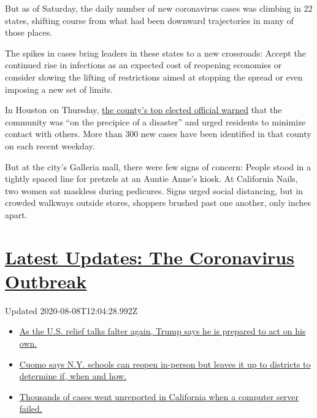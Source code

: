 But as of Saturday, the daily number of new coronavirus cases was
climbing in 22 states, shifting course from what had been downward
trajectories in many of those places.

The spikes in cases bring leaders in these states to a new crossroads:
Accept the continued rise in infections as an expected cost of reopening
economies or consider slowing the lifting of restrictions aimed at
stopping the spread or even imposing a new set of limits.

In Houston on Thursday,
\href{https://www.houstonchronicle.com/news/houston-texas/houston/article/Hidalgo-to-announce-COVID-19-threat-level-15332940.php}{the
county's top elected official warned} that the community was ``on the
precipice of a disaster'' and urged residents to minimize contact with
others. More than 300 new cases have been identified in that county on
each recent weekday.

But at the city's Galleria mall, there were few signs of concern: People
stood in a tightly spaced line for pretzels at an Auntie Anne's kiosk.
At California Nails, two women sat maskless during pedicures. Signs
urged social distancing, but in crowded walkways outside stores,
shoppers brushed past one another, only inches apart.

\hypertarget{latest-updates-the-coronavirus-outbreak}{%
\section{\texorpdfstring{\href{https://www.nytimes.com/2020/08/07/world/covid-19-news.html?action=click\&pgtype=Article\&state=default\&region=MAIN_CONTENT_1\&context=storylines_live_updates}{Latest
Updates: The Coronavirus
Outbreak}}{Latest Updates: The Coronavirus Outbreak}}\label{latest-updates-the-coronavirus-outbreak}}

Updated 2020-08-08T12:04:28.992Z

\begin{itemize}
\tightlist
\item
  \href{https://www.nytimes.com/2020/08/07/world/covid-19-news.html?action=click\&pgtype=Article\&state=default\&region=MAIN_CONTENT_1\&context=storylines_live_updates\#link-1f86d03a}{As
  the U.S. relief talks falter again, Trump says he is prepared to act
  on his own.}
\item
  \href{https://www.nytimes.com/2020/08/07/world/covid-19-news.html?action=click\&pgtype=Article\&state=default\&region=MAIN_CONTENT_1\&context=storylines_live_updates\#link-3f64a70a}{Cuomo
  says N.Y. schools can reopen in-person but leaves it up to districts
  to determine if, when and how.}
\item
  \href{https://www.nytimes.com/2020/08/07/world/covid-19-news.html?action=click\&pgtype=Article\&state=default\&region=MAIN_CONTENT_1\&context=storylines_live_updates\#link-14e70066}{Thousands
  of cases went unreported in California when a computer server failed.}
\end{itemize}

